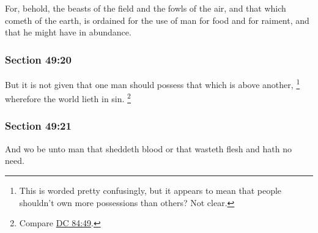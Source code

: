 		For, behold, the beasts of the field and the fowls of the air, and that which cometh of the earth, is ordained for the use of man for food and for raiment, and that he might have in abundance.


	\subsubsection{Section 49:20} %
		\label{DC49-20}

		But it is not given that one man should possess that which is above another,%
			\footnote{%
				This is worded pretty confusingly, but it appears to mean that people shouldn't own more possessions than others? Not clear.
				}
		wherefore the world lieth in sin.%
			\footnote{%
				Compare \hyperref[DC84-49]{DC 84:49}.
				}


	\subsubsection{Section 49:21} %
		\label{DC49-21}

		And wo be unto man that sheddeth blood or that wasteth flesh and hath no need.


